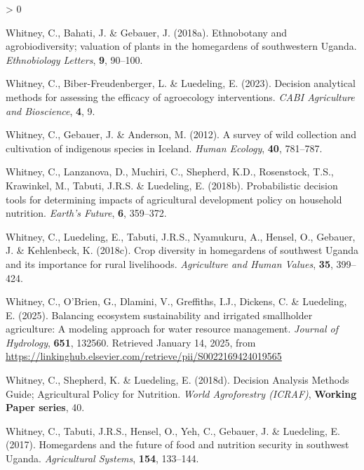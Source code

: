 \documentclass[
]{article}
\newlength{\cslhangindent}
\newenvironment{CSLReferences}[2] %
 {%
  \setlength{\parindent}{0pt}
  \ifodd #1 \everypar{\setlength{\hangindent}{\cslhangindent}}\ignorespaces\fi
  \ifnum #2 > 0
  \setlength{\parskip}{#2\baselineskip}
  \fi
 }%
 {}
\begin{document}
\begin{CSLReferences}{1}{0}
\leavevmode{}%
Whitney, C., Bahati, J. \& Gebauer, J. (2018a). Ethnobotany and
agrobiodiversity; valuation of plants in the homegardens of southwestern
{Uganda}. \emph{Ethnobiology Letters}, \textbf{9}, 90--100.

\leavevmode{}%
Whitney, C., Biber-Freudenberger, L. \& Luedeling, E. (2023). Decision
analytical methods for assessing the efficacy of agroecology
interventions. \emph{CABI Agriculture and Bioscience}, \textbf{4}, 9.

\leavevmode{}%
Whitney, C., Gebauer, J. \& Anderson, M. (2012). A survey of wild
collection and cultivation of indigenous species in {Iceland}.
\emph{Human Ecology}, \textbf{40}, 781--787.

\leavevmode{}%
Whitney, C., Lanzanova, D., Muchiri, C., Shepherd, K.D., Rosenstock,
T.S., Krawinkel, M., Tabuti, J.R.S. \& Luedeling, E. (2018b).
Probabilistic decision tools for determining impacts of agricultural
development policy on household nutrition. \emph{Earth's Future},
\textbf{6}, 359--372.

\leavevmode{}%
Whitney, C., Luedeling, E., Tabuti, J.R.S., Nyamukuru, A., Hensel, O.,
Gebauer, J. \& Kehlenbeck, K. (2018c). Crop diversity in homegardens of
southwest {Uganda} and its importance for rural livelihoods.
\emph{Agriculture and Human Values}, \textbf{35}, 399--424.

\leavevmode{}%
Whitney, C., O'Brien, G., Dlamini, V., Greffiths, I.J., Dickens, C. \&
Luedeling, E. (2025). Balancing ecosystem sustainability and irrigated
smallholder agriculture: {A} modeling approach for water resource
management. \emph{Journal of Hydrology}, \textbf{651}, 132560. Retrieved
January 14, 2025, from
\url{https://linkinghub.elsevier.com/retrieve/pii/S0022169424019565}

\leavevmode{}%
Whitney, C., Shepherd, K. \& Luedeling, E. (2018d). Decision {Analysis}
{Methods} {Guide}; {Agricultural} {Policy} for {Nutrition}. \emph{World
Agroforestry (ICRAF)}, \textbf{Working Paper series}, 40.

\leavevmode{}%
Whitney, C., Tabuti, J.R.S., Hensel, O., Yeh, C., Gebauer, J. \&
Luedeling, E. (2017). Homegardens and the future of food and nutrition
security in southwest {Uganda}. \emph{Agricultural Systems},
\textbf{154}, 133--144.


\end{CSLReferences}
\end{document}
